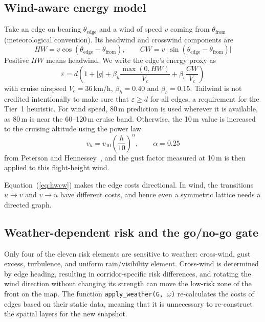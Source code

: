 \subsection{Wind-aware energy model}

Take an edge on bearing $\theta_\mathrm{edge}$ and a wind of speed $v$ coming from
$\theta_\mathrm{from}$ (meteorological convention). Its headwind and crosswind
components are
\begin{equation}
  H\!W = v\cos(\theta_\mathrm{edge} - \theta_\mathrm{from}), \qquad
  C\!W = v\,\lvert\sin(\theta_\mathrm{edge} - \theta_\mathrm{from})\rvert \label{eq:hwcw}
\end{equation}
Positive $H\!W$ means headwind. We write the edge's energy proxy as
\begin{equation}
  \varepsilon = d\left(1 + \lvert g\rvert + \beta_h\frac{\max(0, H\!W)}{V_c}
  + \beta_c\frac{C\!W}{V_c}\right) \label{eq:energy}
\end{equation}
with cruise airspeed $V_c = 36$\,km/h, $\beta_h = 0.40$ and $\beta_c = 0.15$.
Tailwind is not credited intentionally to make sure that $\varepsilon \geq d$ for all
edges, a requirement for the Tier~1 heuristic. For wind speed, 80\,m prediction is used
wherever it is available, as 80\,m is near the 60--120\,m cruise
band. Otherwise, the 10\,m value is increased to the cruising altitude using the power
law
\begin{equation}
  v_h = v_{10}\left(\frac{h}{10}\right)^{\alpha}, \qquad \alpha = 0.25
\end{equation}
from Peterson and Hennessey~\cite{r19}, and the gust factor measured at 10\,m is then
applied to this flight-height wind.

Equation~(\ref{eq:hwcw}) makes the edge costs directional. In wind, the transitions
$u \rightarrow v$ and $v \rightarrow u$ have different costs, and hence even a symmetric
lattice needs a directed graph.

\subsection{Weather-dependent risk and the go/no-go gate}

Only four of the eleven risk elements are sensitive to weather:
cross-wind, gust excess, turbulence, and uniform rain/visibility element. Cross-wind is
determined by edge heading, resulting in corridor-specific risk differences, and
rotating the wind direction without changing its strength can move the low-risk zone of
the front on the map. The function \texttt{apply\_weather(G, $\omega$)} re-calculates
the costs of edges based on their static data, meaning that it is unnecessary to
re-construct the spatial layers for the new snapshot.

